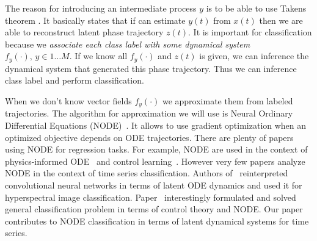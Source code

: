 \documentclass[referee, pdflatex, sn-mathphys-num]{sn-jnl}
\theoremstyle{definition}
\theoremstyle{plain}
\begin{document}
		The reason for introducing an intermediate process $y$ is to be able to use Takens theorem \cite{takens2006detecting}. It basically states that if can estimate $y(t)$ from $x(t)$ then we are able to reconstruct latent phase trajectory $z(t)$. It is important for classification because we \emph{associate each class label with some dynamical system} $f_y(\cdot), \, y \in 1 \ldots M$. If we know all $f_y(\cdot)$ and $z(t)$ is given, we can inference the dynamical system that generated this phase trajectory. Thus we can inference class label and perform classification.
		
		
		When we don't know vector fields $f_y(\cdot)$ we approximate them from labeled trajectories. The algorithm for approximation we will use is Neural Ordinary Differential Equations (NODE)~\cite{node}. It allows to use gradient optimization when an optimized objective depends on ODE trajectories. There are plenty of papers using NODE for regression tasks. For example, NODE are used in the context of physics-informed ODE~\cite{LAI2021116196, phys_informed_2} and control learning~\cite{NEURIPS2019_99a40143, node_rl}. However very few papers analyze NODE in the context of time series classification. Authors of~\cite{8892510} reinterpreted convolutional neural networks in terms of latent ODE dynamics and used it for hyperspectral image classification. Paper~\cite{node_control} interestingly formulated and solved general classification problem in terms of control theory and NODE. Our paper contributes to NODE classification in terms of latent dynamical systems for time series.
		
\end{document}
